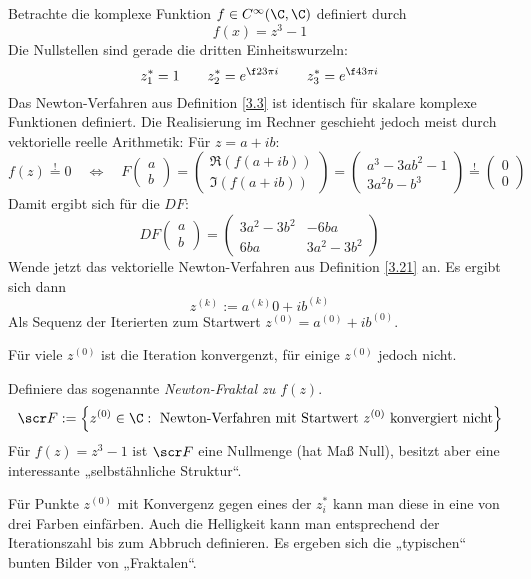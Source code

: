 \documentclass[11pt]{scrartcl}
\begin{document}
\begin{ex*}
	Betrachte die komplexe Funktion $f\in C^\infty(\C, \C)$ definiert durch
	\[
		f(x) = z^3 - 1
	\]
	Die Nullstellen sind gerade die dritten Einheitswurzeln:
	\[
		z_1^* = 1  \qquad z_2^* = e^{\f 23 \pi i} \qquad z_3^* = e^{\f 43 \pi i}
	\]
	Das Newton-Verfahren aus Definition \ref{3.3} ist identisch für skalare komplexe Funktionen definiert.
	Die Realisierung im Rechner geschieht jedoch meist durch vektorielle reelle Arithmetik:
	Für $z = a+ ib$:
	\[
		f(z) \stackrel != 0  \quad \iff\quad F \begin{pmatrix}
			a \\ b
		\end{pmatrix}
		= \begin{pmatrix}
			\Re(f(a+ib)) \\ \Im(f(a+ib))
		\end{pmatrix}
		= \begin{pmatrix}
			a^3 - 3ab^2 - 1 \\
			3a^2 b - b^3
		\end{pmatrix}  \stackrel != \begin{pmatrix}
			0 \\ 0
		\end{pmatrix}
	\]
	Damit ergibt sich für die $DF$:
	\[
		DF \begin{pmatrix}
			a \\ b
		\end{pmatrix} = \begin{pmatrix}
			3a^2 - 3b^2 & -6ba \\
			6ba & 3a^2 - 3b^2
		\end{pmatrix}
	\]
	Wende jetzt das vektorielle Newton-Verfahren aus Definition \ref{3.21} an.
	Es ergibt sich dann
	\[
		z^{(k)} := a^{(k)}0+ ib^{(k)}
	\]
	Als Sequenz der Iterierten zum Startwert $z^{(0)} = a^{(0)} +ib^{(0)}$.

	Für viele $z^{(0)}$ ist die Iteration konvergenzt, für einige $z^{(0)}$ jedoch nicht.

	Definiere das sogenannte \emph{Newton-Fraktal zu $f(z)$}.
	\[
		\scr F := \Big\{ z^{(0)} \in \C : \text{ Newton-Verfahren mit Startwert $z^{(0)}$ konvergiert nicht} \Big\}
	\]
	Für $f(z) = z^3 - 1$ ist $\scr F$ eine Nullmenge (hat Maß Null), besitzt aber eine interessante „selbstähnliche Struktur“.

	Für Punkte $z^{(0)}$ mit Konvergenz gegen eines der $z_i^*$ kann man diese in eine von drei Farben einfärben.
	Auch die Helligkeit kann man entsprechend der Iterationszahl bis zum Abbruch definieren.
	Es ergeben sich die „typischen“ bunten Bilder von „Fraktalen“.
\end{ex*}
\end{document}
